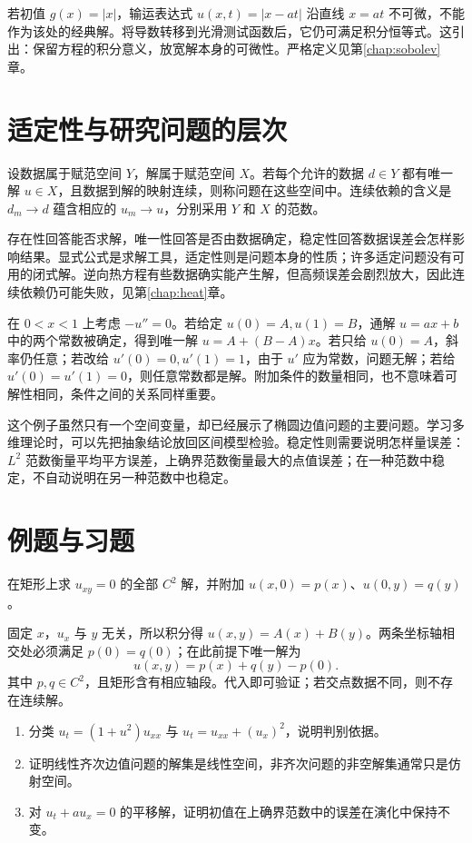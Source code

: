 \documentclass[UTF8,12pt,a4paper,fontset=fandol]{ctexbook}
\begin{document}
若初值 $g(x)=|x|$，输运表达式 $u(x,t)=|x-at|$ 沿直线 $x=at$ 不可微，不能作为该处的经典解。将导数转移到光滑测试函数后，它仍可满足积分恒等式。这引出：保留方程的积分意义，放宽解本身的可微性。严格定义见第\ref{chap:sobolev}章。

\section{适定性与研究问题的层次}
\begin{definition}
设数据属于赋范空间 $Y$，解属于赋范空间 $X$。若每个允许的数据 $d\in Y$ 都有唯一解 $u\in X$，且数据到解的映射连续，则称问题在这些空间中。连续依赖的含义是 $d_m\to d$ 蕴含相应的 $u_m\to u$，分别采用 $Y$ 和 $X$ 的范数。
\end{definition}
存在性回答能否求解，唯一性回答是否由数据确定，稳定性回答数据误差会怎样影响结果。显式公式是求解工具，适定性则是问题本身的性质；许多适定问题没有可用的闭式解。逆向热方程有些数据确实能产生解，但高频误差会剧烈放大，因此连续依赖仍可能失败，见第\ref{chap:heat}章。

\begin{example}[用最简单的问题区分存在性与唯一性]
在 $0<x<1$ 上考虑 $-u''=0$。若给定 $u(0)=A,u(1)=B$，通解 $u=ax+b$ 中的两个常数被确定，得到唯一解 $u=A+(B-A)x$。若只给 $u(0)=A$，斜率仍任意；若改给 $u'(0)=0,u'(1)=1$，由于 $u'$ 应为常数，问题无解；若给 $u'(0)=u'(1)=0$，则任意常数都是解。附加条件的数量相同，也不意味着可解性相同，条件之间的关系同样重要。
\end{example}

这个例子虽然只有一个空间变量，却已经展示了椭圆边值问题的主要问题。学习多维理论时，可以先把抽象结论放回区间模型检验。稳定性则需要说明怎样量误差：$L^2$ 范数衡量平均平方误差，上确界范数衡量最大的点值误差；在一种范数中稳定，不自动说明在另一种范数中也稳定。

\section{例题与习题}
\begin{example}
在矩形上求 $u_{xy}=0$ 的全部 $C^2$ 解，并附加 $u(x,0)=p(x)$、$u(0,y)=q(y)$。
\end{example}
\begin{solve}
固定 $x$，$u_x$ 与 $y$ 无关，所以积分得 $u(x,y)=A(x)+B(y)$。两条坐标轴相交处必须满足 $p(0)=q(0)$；在此前提下唯一解为
\[
 u(x,y)=p(x)+q(y)-p(0).
\]
其中 $p,q\in C^2$，且矩形含有相应轴段。代入即可验证；若交点数据不同，则不存在连续解。
\end{solve}
\begin{enumerate}
 \item 分类 $u_t=(1+u^2)u_{xx}$ 与 $u_t=u_{xx}+(u_x)^2$，说明判别依据。
 \item 证明线性齐次边值问题的解集是线性空间，非齐次问题的非空解集通常只是仿射空间。
 \item 对 $u_t+a u_x=0$ 的平移解，证明初值在上确界范数中的误差在演化中保持不变。
\end{enumerate}
\end{document}
